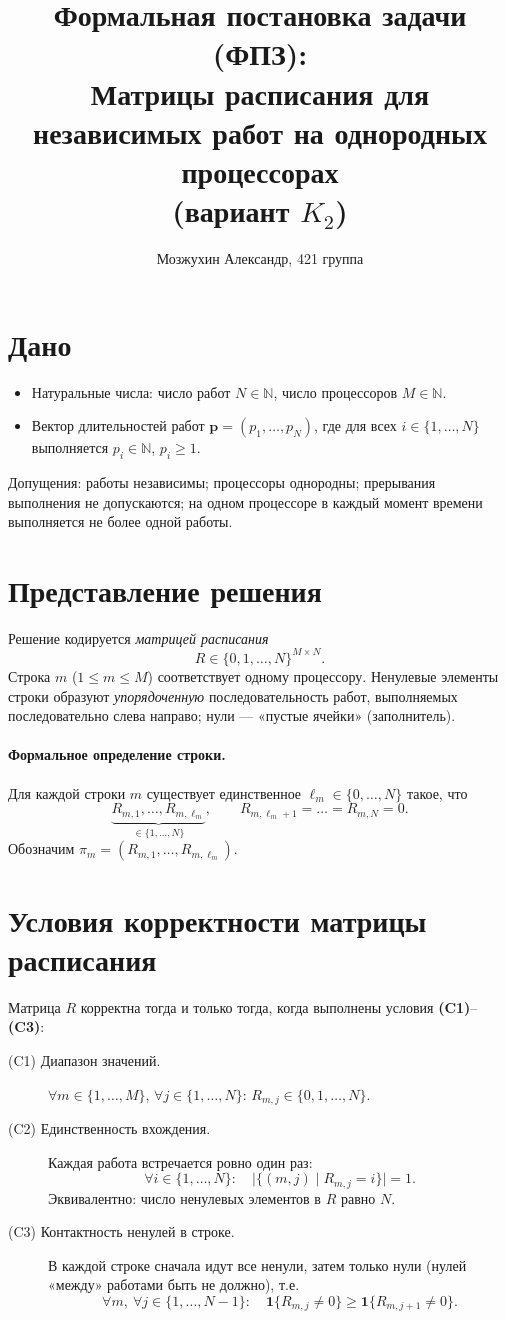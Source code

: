 \documentclass[a4paper,12pt]{article}
\title{Формальная постановка задачи (ФПЗ):\\
Матрицы расписания для независимых работ на однородных процессорах\\
\large(вариант  $K_2$)}
\author{Мозжухин Александр, 421 группа}
\date{}
\newcommand{\NN}{\mathbb{N}}
\newcommand{\1}{\mathbf{1}} %
\begin{document}
\maketitle

\section{Дано}
\begin{itemize}
  \item Натуральные числа: число работ $N\in\NN$, число процессоров $M\in\NN$.
  \item Вектор длительностей работ $\mathbf{p}=(p_1,\dots,p_N)$, где для всех $i\in\{1,\dots,N\}$ выполняется $p_i\in\NN$, $p_i\ge 1$.
\end{itemize}
Допущения: работы независимы; процессоры однородны; прерывания выполнения не допускаются; на одном процессоре в каждый момент времени выполняется не более одной работы.

\section{Представление решения}
Решение кодируется \emph{матрицей расписания}
\[
  R\in\{0,1,\dots,N\}^{M\times N}.
\]
Строка $m$ ($1\le m\le M$) соответствует одному процессору. Ненулевые элементы строки образуют \emph{упорядоченную} последовательность работ, выполняемых последовательно слева направо; нули — «пустые ячейки» (заполнитель).

\paragraph{Формальное определение строки.}
Для каждой строки $m$ существует единственное $\ell_m\in\{0,\dots,N\}$ такое, что
\[
  \underbrace{R_{m,1},\dots,R_{m,\ell_m}}_{\in\{1,\dots,N\}},\qquad
  R_{m,\ell_m+1}=\dots=R_{m,N}=0.
\]
Обозначим $\pi_m=(R_{m,1},\dots,R_{m,\ell_m})$.

\section{Условия корректности матрицы расписания}
Матрица $R$ корректна тогда и только тогда, когда выполнены условия \textbf{(C1)}–\textbf{(C3)}:
\begin{description}
  \item[(C1) Диапазон значений.] $\forall m\in\{1,\dots,M\}$, $\forall j\in\{1,\dots,N\}$: $R_{m,j}\in\{0,1,\dots,N\}$.
  \item[(C2) Единственность вхождения.] Каждая работа встречается ровно один раз:
  \[
    \forall i\in\{1,\dots,N\}:\quad
    \bigl|\{(m,j)\mid R_{m,j}=i\}\bigr|=1.
  \]
  Эквивалентно: число ненулевых элементов в $R$ равно $N$.
  \item[(C3) Контактность ненулей в строке.] В каждой строке сначала идут все ненули, затем только нули (нулей «между» работами быть не должно), т.е.
  \[
    \forall m,\ \forall j\in\{1,\dots,N-1\}:\quad
    \1\{R_{m,j}\neq 0\}\ge \1\{R_{m,j+1}\neq 0\}.
  \]
\end{description}
\end{document}
